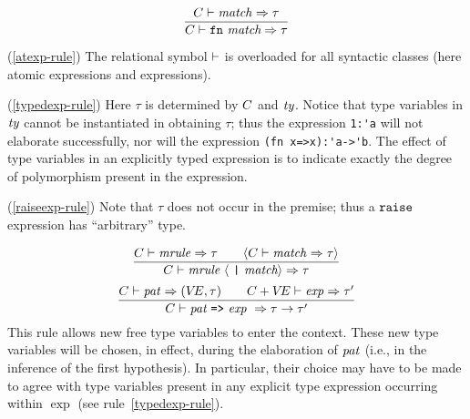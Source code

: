 \begin{equation}        %
\frac{\C\ts\match\ra\tau}
     {\C\ts\fnexp\ra\tau}
\end{equation}
\comments
\begin{description}
\item{(\ref{atexp-rule})}
The relational symbol $\vdash$ is overloaded for all syntactic classes (here
atomic expressions and expressions).
\item{(\ref{typedexp-rule})}
Here $\tau$ is determined by $C$ and ${\it ty}$. Notice that type variables
in ${\it ty}$ cannot be instantiated in obtaining $\tau$; thus the expression
\verb+1:'a+ will not elaborate successfully, nor will the expression
\verb+(fn x=>x):'a->'b+.
The effect of type variables in an explicitly typed expression is
to indicate exactly the degree of polymorphism present in the expression.
\item{(\ref{raiseexp-rule})}
Note that $\tau$ does not occur in the premise; thus a ${\tt raise}$
expression has ``arbitrary'' type.
\end{description}
%
\begin{equation}	%
\frac{\C\ts\mrule\ra\tau\qquad\langle\C\ts\match\ra\tau\rangle}
     {\C\ts\longmatch\ra\tau}\index{28.1}
\end{equation}
\begin{equation}	%
\frac{\C\ts\pat\ra(\VE,\tau)\qquad\C+\VE\ts\exp\ra\tau'}
     {\C\ts\longmrule\ \ra\tau\rightarrow\tau'}
\end{equation}
\comment  This rule allows new free type variables to enter
the context. These new type variables will be chosen, in effect, during
the elaboration of ${\it pat}$ (i.e., in the inference of the first
hypothesis). In particular, their choice may have to be made to
agree with type variables present in any explicit type expression
occurring within $\exp$ (see rule~\ref{typedexp-rule}).

%
%


